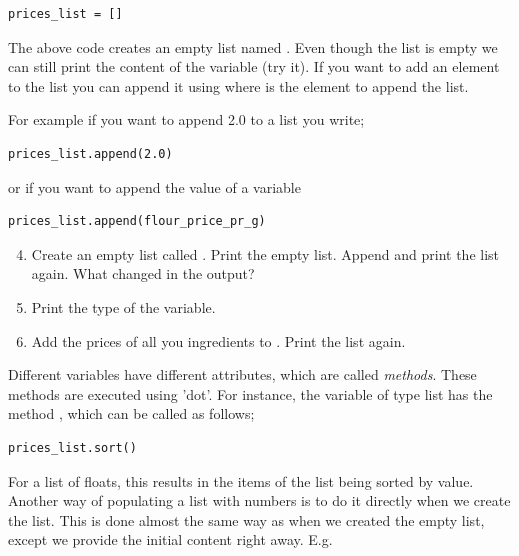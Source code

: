 \documentclass{article}
\begin{document}
\begin{lstlisting}
prices_list = []
\end{lstlisting}

The above code creates an empty list named .
Even though the list is empty we can still print
the content of the variable (try it).
If you want to add an element to the list you can
append it using  where  is the element to append the list.

For example if you want to append 2.0 to a list you write;

\begin{lstlisting}
prices_list.append(2.0)
\end{lstlisting}

or if you want to append the value of a variable

\begin{lstlisting}
prices_list.append(flour_price_pr_g)
\end{lstlisting}

\begin{enumerate}
  \setcounter{enumi}{3}
  \item Create an empty list called .
    Print the empty list.
    Append  and print the list again.
    What changed in the output?

  \item Print the type of the variable.
  
   \item Add the prices of all you ingredients to . Print the list again.

 \end{enumerate}


Different variables have different attributes, which are called {\em methods}.
These methods are executed using 'dot'.
For instance,
the variable of type list has the method ,
which can be called as follows;

\begin{lstlisting}
prices_list.sort()
\end{lstlisting}

For a list of floats, this results in the items of the list being sorted by value.\\

Another way of populating a list with numbers is to do it directly when
we create the list.
This is done almost the same way as when we created the empty list, except we
provide the initial content right away. E.g.
\end{document}
